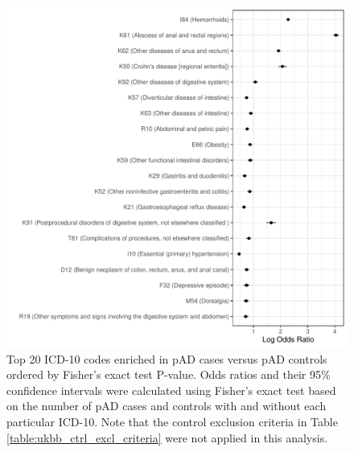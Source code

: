 


\begin{figure}[H] 
  \centering    
  \includegraphics[width=1.0\textwidth]{pheno_enrich}
  \caption[Figure]{Top 20 ICD-10 codes enriched in pAD cases versus pAD controls ordered by Fisher's exact test P-value. Odds ratios and their 95\% confidence intervals were calculated using Fisher's exact test based on the number of pAD cases and controls with and without each particular ICD-10. Note that the control exclusion criteria in Table \ref{table:ukbb_ctrl_excl_criteria} were not applied in this analysis.}
  \label{fig:pheno_enrich}
  \end{figure}



